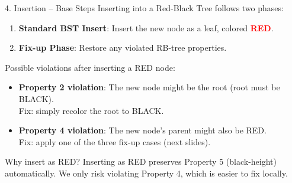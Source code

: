 \documentclass{beamer}
\begin{document}
\begin{frame}{4. Insertion -- Base Steps}
Inserting into a Red-Black Tree follows two phases:

\begin{enumerate}
    \item \textbf{Standard BST Insert}: Insert the new node as a leaf, colored \textcolor{red}{\textbf{RED}}.
    \item \textbf{Fix-up Phase}: Restore any violated RB-tree properties.
\end{enumerate}

\vspace{0.5em}
\pause
Possible violations after inserting a RED node:
\begin{itemize}
    \item \textbf{Property 2 violation}: The new node might be the root (root must be BLACK).\\
          {\small Fix: simply recolor the root to BLACK.}
    \item \textbf{Property 4 violation}: The new node's parent might also be RED.\\
          {\small Fix: apply one of the three fix-up cases (next slides).}
\end{itemize}

\begin{block}{Why insert as RED?}
Inserting as RED preserves Property 5 (black-height) automatically. We only risk violating Property 4, which is easier to fix locally.
\end{block}
\end{frame}
\end{document}
